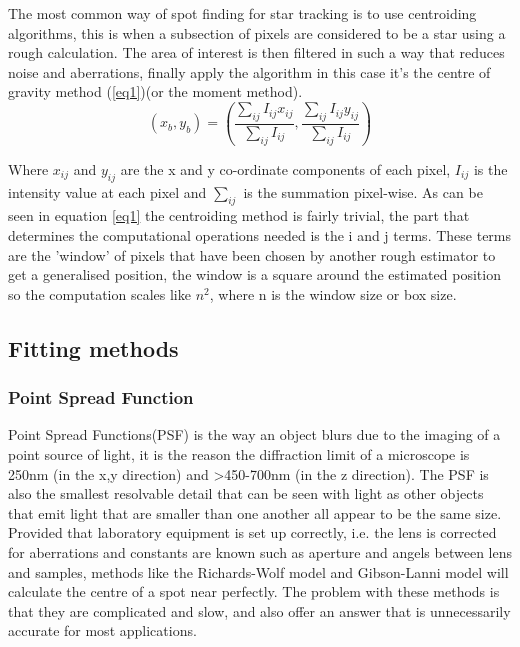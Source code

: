 \documentclass[aps,pra,a4paper,nofootinbib,onecolumn,tightenlines,longbibliography,12pt,amsfonts,amssymb,amsmath,floatfix]{revtex4-2} %
\begin{document}
  
  
  The most common way of spot finding for star tracking is to use centroiding
  algorithms, this is when a subsection of pixels are considered to be a star
  using a rough calculation. The area of interest is then filtered in such a way
  that reduces noise and aberrations, finally apply the algorithm in this case
  it's the centre of gravity method (\ref{eq1})(or the moment
  method)\cite{delabie2014accurate}\cite{stone1989comparison}.
  \begin{equation}\label{eq1}
      (x_b,y_b) = \left( {\frac{\sum_{ij} I_{ij}x_{ij}}{\sum_{ij} I_{ij}},\frac{\sum_{ij} I_{ij}y_{ij}}{\sum_{ij} I_{ij}}}\right)
  \end{equation}
  
  Where $x_{ij}$ and $y_{ij}$ are the x and y co-ordinate components of each pixel, $I_{ij}$ is the intensity 
  value at each pixel and $\sum_{ij}$ is the summation pixel-wise.
  As can be seen in equation \ref{eq1} the centroiding method is fairly trivial, 
  the part that determines the computational operations needed is the i and j terms. 
  These terms are the 'window' of pixels that have been chosen by another rough estimator 
  to get a generalised position, the window is a square around the estimated position so 
  the computation scales like $n^2$, where n is the window size or box size.\cite{stone1989comparison}
  
  \subsection{Fitting methods} %
  \label{sub:Various fitting methods}

  \subsubsection{Point Spread Function} %
    \label{ssub:Point Spread Function}
    
    Point Spread Functions(PSF) is the way an object blurs due to the imaging of a point 
    source of light, it is the reason the diffraction limit of a microscope is 250nm (in the
    x,y direction) and >450-700nm (in the z direction).\cite{galbraith2011super} The PSF is also the smallest resolvable
    detail that can be seen with light as other objects that emit light that are smaller than 
    one another all appear to be the same size. Provided that laboratory equipment is set up correctly, 
    i.e. the lens is corrected for aberrations and constants are known such as aperture and angels 
    between lens and samples, methods like the Richards-Wolf model and Gibson-Lanni model will calculate
    the centre of a spot near perfectly. The problem with these methods is that they are complicated and 
    slow, and also offer an answer that is unnecessarily accurate for most applications. \cite{richards1959electromagnetic}\cite{small2014fluorophore}
 
\end{document}
